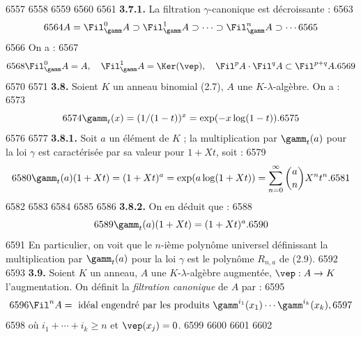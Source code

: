   6557	
  6558	%
  6559	%
  6560	%
  6561		\noindent\textbf{3.7.1.} La filtration $\gamma$-canonique est d\'ecroissante :
  6563	\[
  6564	A = \Fil^0_\gamm A \supset \Fil^1_\gamm A \supset \cdots \supset \Fil^n_\gamm A \supset \cdots
  6565	\]
  6566	On a :
  6567	\begin{equation}
  6568	\Fil^0_\gamm A = A, \quad \Fil^1_\gamm A = \Ker(\vep), \quad \Fil^p A \cdot \Fil^q A \subset \Fil^{p+q} A.
  6569	\end{equation}
  6570	
  6571		\noindent\textbf{3.8.} Soient $K$ un anneau binomial (2.7), $A$ une $K$-$\lambda$-alg\`ebre. On a :
  6573	\begin{equation}
  6574	\gamm_t(x) = (1/(1-t))^x = \exp(-x \log(1-t)).
  6575	\end{equation}
  6576	
  6577		\noindent\textbf{3.8.1.} Soit $a$ un \'el\'ement de $K$ ; la multiplication par $\gamm_t(a)$ pour la loi $\gamma$ est caract\'eris\'ee par sa valeur pour $1 + Xt$, soit :
  6579	\begin{equation}
  6580	\gamm_t(a)(1 + Xt) = (1 + Xt)^a = \exp(a \log(1+Xt)) = \sum_{n=0}^{\infty} \binom{a}{n} X^n t^n.
  6581	\end{equation}
  6582	
  6583	%
  6584	%
  6585	%
  6586		\noindent\textbf{3.8.2.} On en d\'eduit que :
  6588	\begin{equation}
  6589	\gamm_t(a)(1 + Xt) = (1 + Xt)^a.
  6590	\end{equation}
  6591	En particulier, on voit que le $n$-i\`eme polyn\^ome universel d\'efinissant la multiplication par $\gamm_t(a)$ pour la loi $\gamma$ est le polyn\^ome $R_{n,a}$ de (2.9).
  6592	
  6593		\noindent\textbf{3.9.} Soient $K$ un anneau, $A$ une $K$-$\lambda$-alg\`ebre augment\'ee, $\vep : A \to K$ l'augmentation. On d\'efinit la \emph{filtration canonique} de $A$ par :
  6595	\begin{equation}
  6596	\Fil^n A = \text{ id\'eal engendr\'e par les produits } \gamm^{i_1}(x_1) \cdots \gamm^{i_k}(x_k),
  6597	\end{equation}
  6598	o\`u $i_1 + \cdots + i_k \geq n$ et $\vep(x_j) = 0$.
  6599	
  6600	%
  6601	%
  6602	%
